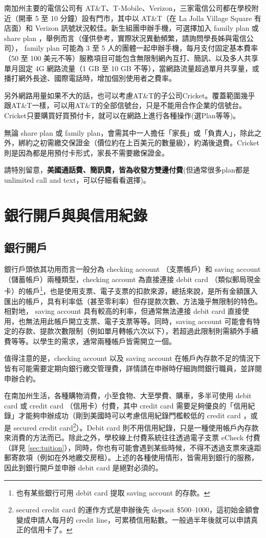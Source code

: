 \documentclass[10pt,a4paper]{book}
\begin{document}
\begin{CJK}{UTF8}{bkai}
南加州主要的電信公司有 AT\&T、T-Mobile、Verizon，三家電信公司都在學校附近（開車 5 至 10 分鐘）設有門市，其中以 AT\&T（在 La Jolla Village Square 有店面）和 Verizon 訊號狀況較佳。新生組團申辦手機，可選擇加入 family plan 或 share plan ，舉例而言（僅供參考，實際狀況異動頻繁，請詢問學長姊與電信公司）， family plan 可能為 3 至 5 人的團體一起申辦手機，每月支付固定基本費率（50 至 100 美元不等）服務項目可能包含無限制網內互打、簡訊、以及多人共享單月固定 4G 網路流量（1 GB 至 10 GB 不等），當網路流量超過單月共享量，或播打網外長途、國際電話時，增加個別使用者之費率。

另外網路用量如果不大的話，也可以考慮AT\&T的子公司Cricket。覆蓋範圍幾乎跟AT\&T一樣，可以用AT\&T的全部信號台，只是不能用合作企業的信號台。Cricket只要購買好買預付卡，就可以在網路上進行各種操作(選Plan等等)。

無論 share plan 或 family plan，會需其中一人擔任「家長」或「負責人」，除此之外，綁約之初需繳交保證金（價位約在上百美元的數量級），約滿後退費。Cricket則是因為都是用預付卡形式，家長不需要繳保證金。

請特別留意，\textbf{美國通話費、簡訊費，皆為收發方雙邊付費}(但通常很多plan都是unlimited call and text，可以仔細看看選擇)。

\section{銀行開戶與與信用紀錄}\label{sec:banking}
\subsection{銀行開戶}
銀行戶頭依其功用而言一般分為 checking account （支票帳戶）和 saving account （儲蓄帳戶）兩種類型，checking account 為直接連接 debit card （類似郵局現金卡）的帳戶\footnote{也有某些銀行可用 debit card 提取 saving account 的存款。}，也是使用支票、電子支票的扣款來源，總括來說，是所有金額匯入匯出的帳戶，具有利率低（甚至零利率）但存提款次數、方法幾乎無限制的特色。相對地， saving account 具有較高的利率，但通常無法連接 debit card 直接使用，也無法用此帳戶開立支票、電子支票等等。同時，saving account 可能會有特定的存款、提款次數限制（例如單月轉帳六次以下），若超過此限制則需額外手續費等等。以學生的需求，通常兩種帳戶皆需開立一個。

值得注意的是，checking account 以及 saving account 在帳戶內存款不足的情況下皆有可能需要定期向銀行繳交管理費，詳情請在申辦時仔細詢問銀行職員，並詳閱申辦合約。

在南加州生活，各種購物消費，小至食物、大至學費、購車，多半可使用 debit card 或 credit card （信用卡）付費，其中 credit card 需要足夠優良的「信用紀錄」才能夠申辦成功（剛到美國時可以考慮信用紀錄門檻較低的 credit card ，或是 secured credit card\footnote{secured credit card 的運作方式是申辦後先 deposit \$500--1000，這初始金額會變成申請人每月的 credit line，可累積信用點數。一般過半年後就可以申請真正的信用卡了。}）。Debit card 則不用信用紀錄，只是一種使用帳戶內存款來消費的方法而已。除此之外，學校線上付費系統往往透過電子支票 eCheck 付費（詳見 \ref{sec:tuition}），同時，你也有可能會遇到某些時候，不得不透過支票來遠距郵寄款項（例如在外地繳交房租）。上述的各種使用情形，皆需用到銀行的服務，因此到銀行開戶並申辦 debit card 是絕對必須的。


\end{CJK}
\end{document}
